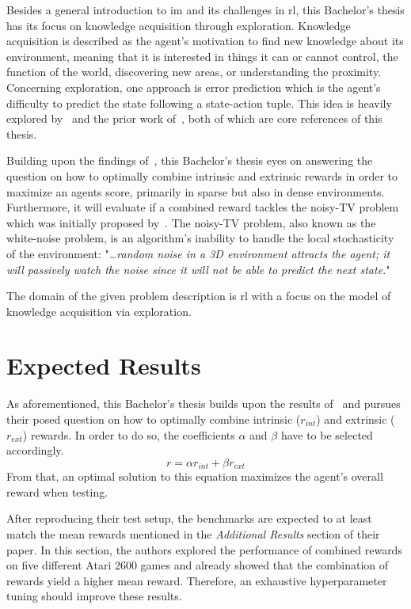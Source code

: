 \documentclass[draft,final]{vutinfth} %
\newcommand{\p}[1]{see p. #1}
\begin{document}
    Besides a general introduction to \gls{im} and its challenges in \gls{rl}, this Bachelor's thesis has its focus on knowledge acquisition through exploration.
    Knowledge acquisition is described as the agent's motivation to find new knowledge about its environment, meaning that it is interested in things it can or cannot control, the function of the world, discovering new areas, or understanding the proximity.
    Concerning exploration, one approach is error prediction which is the agent's difficulty to predict the state following a state-action tuple.
    This idea is heavily explored by~\cite{burda_large-scale_2018-1} and the prior work of~\cite{pathak_curiosity-driven_2017-1}, both of which are core references of this thesis.

    Building upon the findings of~\citet{burda_large-scale_2018-1}, this Bachelor's thesis eyes on answering the question on how to optimally combine intrinsic and extrinsic rewards in order to maximize an agents score, primarily in sparse but also in dense environments.
    Furthermore, it will evaluate if a combined reward tackles the noisy-TV problem which was initially proposed by~\cite{schmidhuber_formal_2010}.
    The noisy-TV problem, also known as the white-noise problem, is an algorithm's inability to handle the local stochasticity of the environment: "\textit{\ldots random noise in a 3D environment attracts the agent; it will passively watch the noise since it will not be able to predict the next state.}"\cite[\p{10}]{aubret_survey_2019}

    The domain of the given problem description is \gls{rl} with a focus on the model of knowledge acquisition via exploration.


    \section{Expected Results}\label{sec:expected-results}
    As aforementioned, this Bachelor's thesis builds upon the results of~\citet{burda_large-scale_2018-1} and pursues their posed question on how to optimally combine intrinsic ($r_{int}$) and extrinsic ($r_{ext}$) rewards.
    In order to do so, the coefficients $\alpha$ and $\beta$ have to be selected accordingly.
    \[r=\alpha r_{int} + \beta r_{ext}\]
    From that, an optimal solution to this equation maximizes the agent's overall reward when testing.

    After reproducing their test setup, the benchmarks are expected to at least match the mean rewards mentioned in the \textit{Additional Results} section of their paper.
    In this section, the authors explored the performance of combined rewards on five different Atari 2600 games and already showed that the combination of rewards yield a higher mean reward.
    Therefore, an exhaustive hyperparameter tuning should improve these results.
\end{document}
